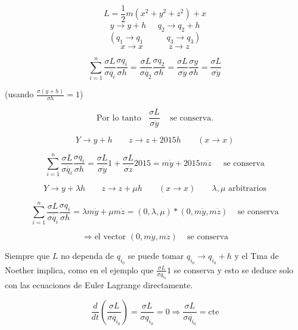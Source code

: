 \begin{example}

	$$L = \frac{1}{2} m (x^2 + y^2 + z^2) + x$$
	$$ y \rightarrow y + h \;\;\;\;\; q_2 \rightarrow q_2 + h $$
	$$ (q_1 \rightarrow q_1 \;\;\;\;\;\;\;\;\;\; q_3 \rightarrow q_3) $$
	$$x \rightarrow x \;\;\;\;\;\;\;\;\;\;\; z \rightarrow z$$

	$$ \sum_{i = 1}^n \frac{\sigma L}{\sigma \dot{q_i}} \frac{\sigma q_i}{\sigma h} =  \frac{\sigma L}{\sigma \dot{q_2}} \frac{\sigma q_2}{\sigma h} = \frac{\sigma L}{\sigma \dot{y}} \frac{\sigma y}{\sigma h} = \frac{\sigma L}{\sigma \dot{y}}$$

	(usando $\frac{\sigma (y + h)}{\sigma h} = 1$)

	$$ \text{Por lo tanto } \;\; \frac{\sigma L}{\sigma \dot{y}} \;\;\; \text{ se conserva}.$$

\end{example}

\begin{example}

	$$Y \rightarrow y + h \;\;\;\;\;\;\; z \rightarrow z + 2015 h \;\;\;\;\;\;\; (x \rightarrow x)$$

	$$\sum_{i = 1}^n \frac{\sigma L}{\sigma \dot{q_i}} \frac{\sigma q_i}{\sigma h} = \frac{\sigma L}{\sigma \dot{y}} 1 + \frac{\sigma L}{\sigma \dot{z}} 2015 = m \dot{y} + 2015 m \dot{z} \;\;\;\; \text{ se conserva}$$

\end{example}

\begin{example}


	$$Y \rightarrow y + \lambda h \;\;\;\;\;\;\; z \rightarrow z + \mu h \;\;\;\;\;\;\; (x \rightarrow x) \;\;\;\;\;\;\; \lambda, \mu \text{  arbitrarios}$$

	$$\sum_{i = 1}^n \frac{\sigma L}{\sigma \dot{q_i}} \frac{\sigma q_i}{\sigma h} = \lambda m \dot{y} + \mu m \dot{z} = (0, \lambda, \mu) * (0, m\dot{y}, m\dot{z}) \;\;\; \text{ se conserva}$$

	$$ \Rightarrow \text{el vector } (0, m\dot{y}, m\dot{z}) \;\;\; \text{ se conserva}$$ %

\end{example}

\begin{obs}

	Siempre que $L$ no dependa de $q_{i_0}$ se puede tomar $q_{i_0} \rightarrow q_{i_0} + h$ y el Tma de Noether implica, como en el ejemplo que $\frac{\sigma L}{\sigma \dot{q_{i_0}}} 1$ se conserva y esto se deduce solo con las ecuaciones de Euler Lagrange directamente.

	$$ \frac{d}{dt} (\frac{\sigma L}{\sigma \dot{q_{i_0}}}) = \frac{\sigma L}{\sigma q_{i_0}} = 0 \Rightarrow \frac{\sigma L}{\sigma \dot{q_{i_0}}} = \text{cte}$$

\end{obs}

